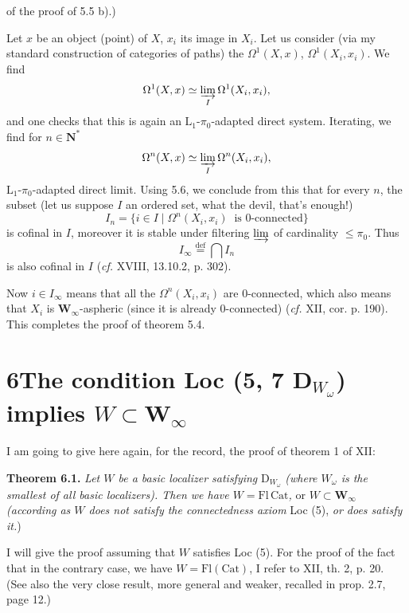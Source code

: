 \documentclass[11pt]{article}
\newcommand{\printedpage}[1]{\marginpar{\footnotesize p.~#1}}
\newcommand{\msp}[1]{\marginpar{\footnotesize [#1]}}
\begin{document}
\printedpage{44}

\msp{page 82}
of the proof of 5.5 b).)

Let $x$ be an object (point) of $X$, $x_i$ its image in $X_i$. Let us consider (via my standard construction of categories of paths) the $\Omega^1(X,x)$, $\Omega^1(X_i,x_i)$. We find
\[ \Omega^1(X,x) \simeq \varinjlim_{I} \Omega^1(X_i,x_i), \]
and one checks that this is again an $\mathrm{L}_1$-$\pi_0$-adapted direct system. Iterating, we find for $n \in \mathbf{N}^*$
\[ \Omega^n(X,x) \simeq \varinjlim_{I} \Omega^n(X_i,x_i), \]
$\mathrm{L}_1$-$\pi_0$-adapted direct limit. Using 5.6, we conclude from this that for every $n$, the subset (let us suppose $I$ an ordered set, what the devil, that's enough!)
\[ I_n = \{ i \in I \mid \Omega^n(X_i,x_i) \ \text{ is 0-connected} \} \]
is cofinal in $I$, moreover it is stable under filtering $\varinjlim$ of cardinality $\leq \pi_0$. Thus %
\[ I_\infty \overset{\text{def}}{=} \bigcap I_n \]
is also cofinal in $I$ (\textit{cf.} XVIII, 13.10.2, p. 302).

\msp{page 83}
Now $i \in I_\infty$ means that all the $\Omega^n(X_i,x_i)$ are 0-connected, which also means that $X_i$ is $\mathbf{W}_\infty$-aspheric (since it is already 0-connected) (\textit{cf.} XII, cor. p. 190). This completes the proof of theorem 5.4.

\section*{6\quad The condition Loc (5, 7 D$_{W_\omega}$) implies $W \subset \mathbf{W}_\infty$}

I am going to give here again, for the record, the proof of theorem 1 of XII:

\textbf{Theorem 6.1.} \textit{Let $W$ be a basic localizer satisfying} D$_{W_\omega}$ \textit{(where $W_\omega$ is the smallest of all basic localizers). Then we have $W = \mathrm{Fl}\,\mathrm{Cat}$,} or \textit{$W \subset \mathbf{W}_\infty$ (according as $W$ does not satisfy the connectedness axiom} Loc (5), \textit{or does satisfy it.})

I will give the proof assuming that $W$ satisfies Loc (5). For the proof of the fact that in the contrary case, we have $W = \mathrm{Fl}(\mathrm{Cat})$, I refer to XII, th. 2, p. 20. (See also the very close result, more general and weaker, recalled in prop. 2.7, page 12.)
\end{document}

